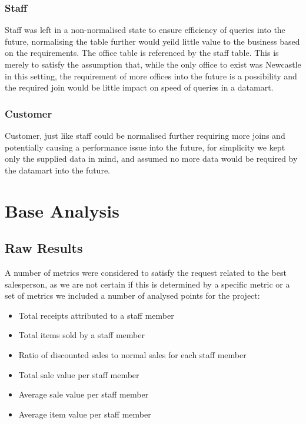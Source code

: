 \documentclass{article}
\begin{document}
            \subsubsection{Staff}
                Staff was left in a non-normalised state to ensure efficiency of queries into the future, 
                normalising the table further would yeild little value to the business based on the requirements.
                The office table is referenced by the staff table. This is merely to satisfy the assumption
                that, while the only office to exist was Newcastle in this setting, the requirement of more 
                offices into the future is a possibility and the required join would be little impact on speed
                of queries in a datamart.
            \subsubsection{Customer}
                Customer, just like staff could be normalised further requiring more joins and potentially 
                causing a performance issue into the future, for simplicity we kept only the supplied
                data in mind, and assumed no more data would be required by the datamart into the future.

    \section{Base Analysis}
    \label{sec:BA}
        \subsection{Raw Results}
            A number of metrics were considered to satisfy the request related to the best salesperson,
            as we are not certain if this is determined by a specific metric or a set of metrics we 
            included a number of analysed points for the project:
            \begin{itemize}
                \item Total receipts attributed to a staff member
                \item Total items sold by a staff member
                \item Ratio of discounted sales to normal sales for each staff member
                \item Total sale value per staff member
                \item Average sale value per staff member
                \item Average item value per staff member
            \end{itemize}
\end{document}

